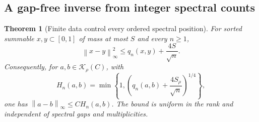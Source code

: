 \documentclass[11pt,a4paper]{amsart}
\numberwithin{equation}{section}
\newtheorem{theorem}{Theorem}[section]
\theoremstyle{definition}
\theoremstyle{remark}
\newcommand{\norm}[1]{\left\lVert#1\right\rVert}
\begin{document}
\subsection{A gap-free inverse from integer spectral counts}
\begin{theorem}[Finite data control every ordered spectral position]\label{thm:pfaffian_inverse}
For sorted summable $x,y\subset[0,1]$ of mass at most $S$ and every $n\ge1$,
\begin{equation}\label{eq:pfaffian_square_inverse}
 \norm{x-y}_\infty^2\le q_n(x,y)+\frac{4S}{\sqrt n}.
\end{equation}
Consequently, for $a,b\in\mathcal K_\rho(C)$, with
\begin{equation}\label{eq:pfaffian_Hn}
 H_n(a,b)=\min\left\{1,
     \left(q_n(a,b)+\frac{4S_\rho}{\sqrt n}\right)^{1/4}\right\},
\end{equation}
one has $\norm{a-b}_\infty\le CH_n(a,b)$. The bound is uniform in the rank and independent of spectral gaps and multiplicities.
\end{theorem}
\end{document}
